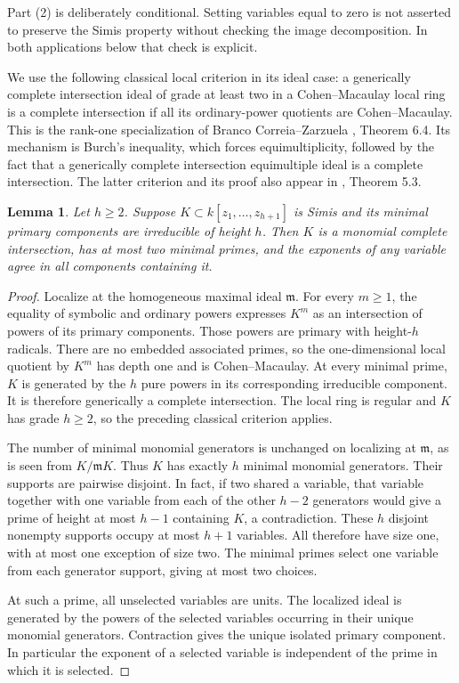\documentclass[11pt]{article}
\newtheorem{lemma}[theorem]{Lemma}
\begin{document}
Part (2) is deliberately conditional. Setting variables equal to zero
is not asserted to preserve the Simis property without checking the
image decomposition. In both applications below that check is explicit.

We use the following classical local criterion in its ideal case:
a generically complete intersection ideal of grade at least two
in a Cohen--Macaulay local ring is a complete intersection if all
its ordinary-power quotients are Cohen--Macaulay. This is the rank-one
specialization of Branco Correia--Zarzuela \cite{BCZ}, Theorem 6.4.
Its mechanism is Burch's inequality, which forces equimultiplicity,
followed by the fact that a generically complete intersection
equimultiple ideal is a complete intersection. The latter criterion
and its proof also appear in \cite{BCZ2}, Theorem 5.3.

\begin{lemma}\label{lem:dimensionone}
Let $h\geq2$. Suppose $K\subset k[z_1,\ldots,z_{h+1}]$ is Simis
and its minimal primary components are irreducible of height $h$.
Then $K$ is a monomial complete intersection, has at most two minimal
primes, and the exponents of any variable agree in all components
containing it.
\end{lemma}
\begin{proof}
Localize at the homogeneous maximal ideal $\mathfrak m$.
For every $m\geq1$, the equality of symbolic and ordinary powers
expresses $K^m$ as an intersection of powers of its primary components.
Those powers are primary with height-$h$ radicals. There are no
embedded associated primes, so the one-dimensional local quotient
by $K^m$ has depth one and is Cohen--Macaulay. At every minimal prime,
$K$ is generated by the $h$ pure powers in its corresponding
irreducible component. It is therefore generically a complete
intersection. The local ring is regular and $K$ has grade $h\geq2$,
so the preceding classical criterion applies.

The number of minimal monomial generators is unchanged on localizing
at $\mathfrak m$, as is seen from $K/\mathfrak mK$. Thus $K$ has
exactly $h$ minimal monomial generators. Their supports are pairwise
disjoint. In fact, if two shared a variable, that variable together
with one variable from each of the other $h-2$ generators would give
a prime of height at most $h-1$ containing $K$, a contradiction.
These $h$ disjoint nonempty supports occupy at most $h+1$ variables.
All therefore have size one, with at most one exception of size two.
The minimal primes select one variable from each generator support,
giving at most two choices.

At such a prime, all unselected variables are units. The localized
ideal is generated by the powers of the selected variables occurring
in their unique monomial generators. Contraction gives the unique
isolated primary component. In particular the exponent of a selected
variable is independent of the prime in which it is selected.
\end{proof}
\end{document}
